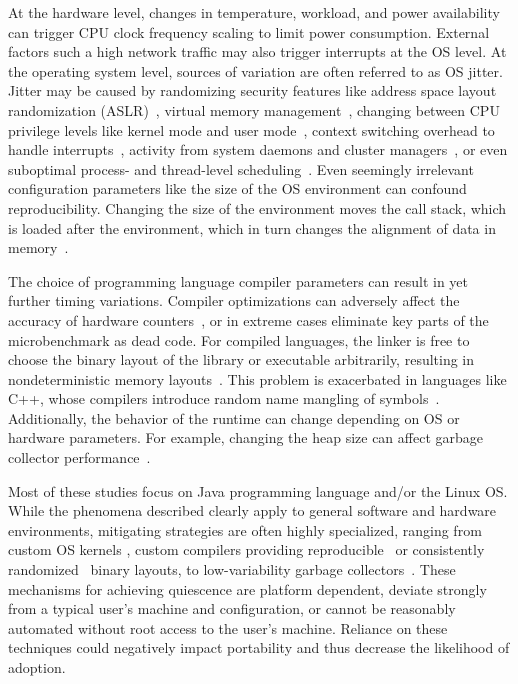 \documentclass[conference]{IEEEtran}
\begin{document}
At the hardware level, changes in temperature, workload, and power availability
can trigger CPU clock frequency scaling to limit power consumption.
External factors such a high network traffic may also trigger interrupts at the
OS level.
At the operating system level, sources of variation are often referred to as
OS jitter.
Jitter may be caused by randomizing security features like address space layout
randomization (ASLR)~\cite{Shacham2004},
virtual memory management~\cite{Oyama2014,Oyama2016},
changing between CPU privilege levels like kernel mode and user mode~\cite{Zaparanuks2009},
context switching overhead to handle interrupts~\cite{Tsafrir2007},
activity from system daemons and cluster managers~\cite{Petrini2003},
or even suboptimal process- and thread-level scheduling~\cite{Lozi2016}.
Even seemingly irrelevant configuration parameters like the size of the
OS environment can confound reproducibility. Changing the size of the
environment moves the call stack, which is loaded after the environment, which
in turn changes the alignment of data in memory~\cite{Mytkowicz2009}.

The choice of programming language compiler parameters can result in yet
further timing variations.
Compiler optimizations can adversely affect the accuracy of hardware
counters~\cite{Zaparanuks2009}, or in extreme cases eliminate key parts of the
microbenchmark as dead code.
For compiled languages, the linker is free to choose the binary layout of the
library or executable arbitrarily, resulting in nondeterministic memory
layouts~\cite{Georges2008}. This problem is exacerbated in languages like C++,
whose compilers introduce random name mangling of symbols~\cite{Kalibera2005}.
Additionally, the behavior of the runtime can change depending on OS or hardware
parameters. For example, changing the heap size can affect garbage collector
performance~\cite{Blackburn2004}.

Most of these studies focus on Java programming language and/or the Linux OS.
While the phenomena described clearly apply to general software and hardware environments,
mitigating strategies are often highly specialized, ranging from custom OS
kernels \cite{Tessellation,Akkan2012}, custom compilers providing
reproducible~\cite{Georges2008} or consistently randomized~\cite{Curtsinger2013}
binary layouts, to low-variability garbage collectors~\cite{Huang2004}.
These mechanisms for achieving quiescence are platform dependent, deviate strongly
from a typical user's machine and configuration, or cannot be reasonably automated without
root access to the user's machine. Reliance on these techniques could negatively impact
portability and thus decrease the likelihood of adoption.
\end{document}
